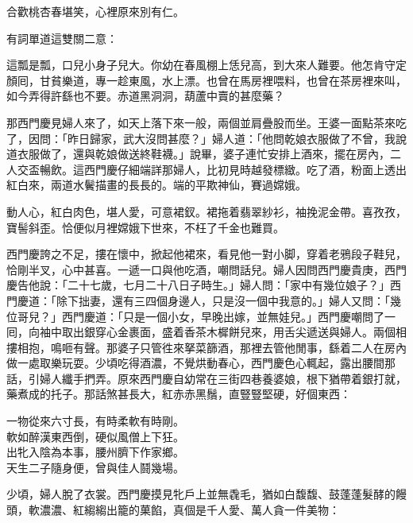 \begin{myquote} 
合歡桃杏春堪笑，心裡原來別有仁。
\end{myquote} 

有詞單道這雙關二意：

\begin{myquote} 
這瓢是瓢，口兒小身子兒大。你幼在春風棚上恁兒高，到大來人難要。他怎肯守定顏囘，甘貧樂道，專一趁東風，水上漂。也曾在馬房裡喂料，也曾在茶房裡來叫，如今弄得許繇也不要。赤道黑洞洞，葫蘆中賣的甚麼藥？
\end{myquote} 

那西門慶見婦人來了，如天上落下來一般，兩個並肩疊股而坐。王婆一面點茶來吃了，因問：「昨日歸家，武大沒問甚麼？」婦人道：「他問乾娘衣服做了不曾，我說道衣服做了，還與乾娘做送終鞋襪。」說畢，婆子連忙安排上酒來，擺在房內，二人交盃暢飲。這西門慶仔細端詳那婦人，比初見時越發標緻。吃了酒，粉面上透出紅白來，兩道水鬢描畫的長長的。端的平欺神仙，賽過嫦娥。

\begin{myquote} 
動人心，紅白肉色，堪人愛，可意裙釵。裙拖着翡翠紗衫，袖挽泥金帶。喜孜孜，寶髻斜歪。恰便似月裡嫦娥下世來，不枉了千金也難買。

\end{myquote} 

西門慶誇之不足，摟在懷中，掀起他裙來，看見他一對小脚，穿着老鴉段子鞋兒，恰剛半叉，心中甚喜。一遞一口與他吃酒，嘲問話兒。婦人因問西門慶貴庚，西門慶告他說：「二十七歲，七月二十八日子時生。」婦人問：「家中有幾位娘子？」西門慶道：「除下拙妻，還有三四個身邊人，只是沒一個中我意的。」婦人又問：「幾位哥兒？」西門慶道：「只是一個小女，早晚出嫁，並無娃兒。」西門慶嘲問了一囘，向袖中取出銀穿心金裹面，盛着香茶木樨餅兒來，用舌尖遞送與婦人。兩個相摟相抱，鳴咂有聲。那婆子只管徃來拏菜篩酒，那裡去管他閒事，繇着二人在房內做一處取樂玩耍。少頃吃得酒濃，不覺烘動春心，西門慶色心輒起，露出腰間那話，引婦人纖手捫弄。原來西門慶自幼常在三街四巷養婆娘，根下猶帶着銀打就，藥煮成的托子。那話煞甚長大，紅赤赤黑鬚，直豎豎堅硬，好個東西：

\begin{myquote} 
一物從來六寸長，有時柔軟有時剛。\\軟如醉漢東西倒，硬似風僧上下狂。\\出牝入陰為本事，腰州臍下作家鄉。\\天生二子隨身便，曾與佳人鬪幾場。{}
\end{myquote} 

少頃，婦人脫了衣裳。西門慶摸見牝戶上並無毳毛，猶如白馥馥、鼓蓬蓬髮酵的饅頭，軟濃濃、紅縐縐出籠的菓餡，真個是千人愛、萬人貪一件美物：

